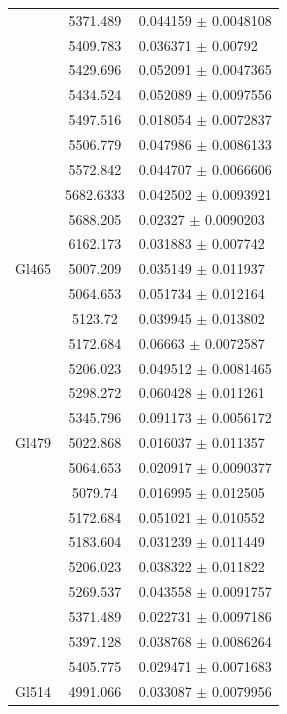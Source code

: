 \begin{longtable}{|c|c|l|}
 & 5371.489 & 0.044159 $\pm$ 0.0048108 \\       
 & 5409.783 & 0.036371 $\pm$ 0.00792 \\         
 & 5429.696 & 0.052091 $\pm$ 0.0047365 \\       
 & 5434.524 & 0.052089 $\pm$ 0.0097556 \\       
 & 5497.516 & 0.018054 $\pm$ 0.0072837 \\       
 & 5506.779 & 0.047986 $\pm$ 0.0086133 \\       
 & 5572.842 & 0.044707 $\pm$ 0.0066606 \\       
 & 5682.6333 & 0.042502 $\pm$ 0.0093921 \\      
 & 5688.205 & 0.02327 $\pm$ 0.0090203 \\        
 & 6162.173 & 0.031883 $\pm$ 0.007742 \\        
\hline                                          
Gl465 & 5007.209 & 0.035149 $\pm$ 0.011937 \\   
 & 5064.653 & 0.051734 $\pm$ 0.012164 \\        
 & 5123.72 & 0.039945 $\pm$ 0.013802 \\         
 & 5172.684 & 0.06663 $\pm$ 0.0072587 \\        
 & 5206.023 & 0.049512 $\pm$ 0.0081465 \\       
 & 5298.272 & 0.060428 $\pm$ 0.011261 \\        
 & 5345.796 & 0.091173 $\pm$ 0.0056172 \\       
\hline                                          
Gl479 & 5022.868 & 0.016037 $\pm$ 0.011357 \\   
 & 5064.653 & 0.020917 $\pm$ 0.0090377 \\       
 & 5079.74 & 0.016995 $\pm$ 0.012505 \\         
 & 5172.684 & 0.051021 $\pm$ 0.010552 \\        
 & 5183.604 & 0.031239 $\pm$ 0.011449 \\        
 & 5206.023 & 0.038322 $\pm$ 0.011822 \\        
 & 5269.537 & 0.043558 $\pm$ 0.0091757 \\       
 & 5371.489 & 0.022731 $\pm$ 0.0097186 \\       
 & 5397.128 & 0.038768 $\pm$ 0.0086264 \\       
 & 5405.775 & 0.029471 $\pm$ 0.0071683 \\       
\hline                                          
Gl514 & 4991.066 & 0.033087 $\pm$ 0.0079956 \\  

\end{longtable}
